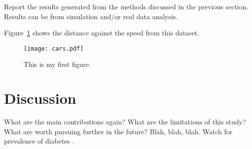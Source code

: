 \documentclass[12pt]{article}
\begin{document}
Report the results generated from the methods discussed in the previous section.  
Results can be from simulation and/or real data analysis.  

Figure~\ref{fig:cars} shows the distance against the speed from this dataset.

\begin{figure}[!t]
  \centering
  \texttt{[image: cars.pdf]}
  \caption{This is my first figure.}
  \label{fig:cars}
\end{figure}

\section{Discussion}
\label{sec:disc}

What are the main contributions again?
What are the limitations of this study?
What are worth pursuing further in the future?
Blah, blah, blah.  Watch for prevalence of diabetes \citep{wild2004global}.





\end{document}
